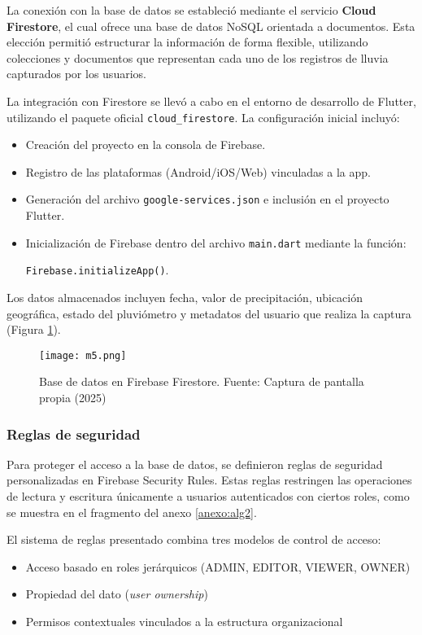 La conexión con la base de datos se estableció mediante el servicio \textbf{Cloud Firestore}, el cual ofrece una base de datos NoSQL orientada a documentos. Esta elección permitió estructurar la información de forma flexible, utilizando colecciones y documentos que representan cada uno de los registros de lluvia capturados por los usuarios.

La integración con Firestore se llevó a cabo en el entorno de desarrollo de Flutter, utilizando el paquete oficial \texttt{cloud\_firestore}. La configuración inicial incluyó:

\begin{itemize}
    \item Creación del proyecto en la consola de Firebase.
    \item Registro de las plataformas (Android/iOS/Web) vinculadas a la app.
    \item Generación del archivo \texttt{google-services.json} e inclusión en el proyecto Flutter.
    \item Inicialización de Firebase dentro del archivo \texttt{main.dart} mediante la función:
    
    \texttt{Firebase.initializeApp()}.
\end{itemize}

Los datos almacenados incluyen fecha, valor de precipitación, ubicación geográfica, estado del pluviómetro y metadatos del usuario que realiza la captura (Figura \ref{m5}).

\begin{figure}[h!]
\centering
  \texttt{[image: m5.png]}
  \caption{Base de datos en Firebase Firestore. Fuente: Captura de pantalla propia (2025)}
  \label{m5}
\end{figure}

\newpage
\subsubsection*{Reglas de seguridad}

Para proteger el acceso a la base de datos, se definieron reglas de seguridad personalizadas en Firebase Security Rules. Estas reglas restringen las operaciones de lectura y escritura únicamente a usuarios autenticados con ciertos roles, como se muestra en el fragmento del anexo \ref{anexo:alg2}.


El sistema de reglas presentado combina tres modelos de control de acceso:

\begin{itemize}
\item Acceso basado en roles jerárquicos (ADMIN, EDITOR, VIEWER, OWNER)
\item Propiedad del dato (\textit{user ownership})
\item Permisos contextuales vinculados a la estructura organizacional
\end{itemize}



